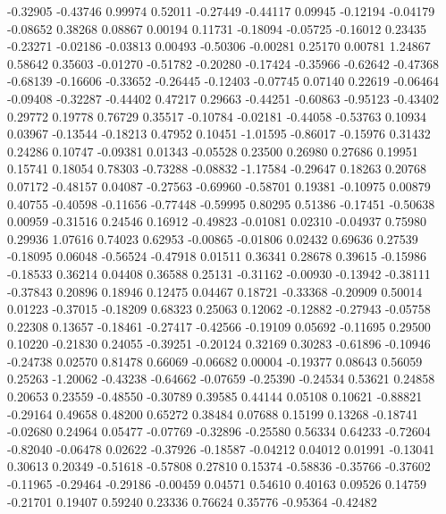   -0.32905 -0.43746
   0.99974  0.52011
  -0.27449 -0.44117
   0.09945 -0.12194
  -0.04179 -0.08652
   0.38268  0.08867
   0.00194  0.11731
  -0.18094 -0.05725
  -0.16012  0.23435
  -0.23271 -0.02186
  -0.03813  0.00493
  -0.50306 -0.00281
   0.25170  0.00781
   1.24867  0.58642
   0.35603 -0.01270
  -0.51782 -0.20280
  -0.17424 -0.35966
  -0.62642 -0.47368
  -0.68139 -0.16606
  -0.33652 -0.26445
  -0.12403 -0.07745
   0.07140  0.22619
  -0.06464 -0.09408
  -0.32287 -0.44402
   0.47217  0.29663
  -0.44251 -0.60863
  -0.95123 -0.43402
   0.29772  0.19778
   0.76729  0.35517
  -0.10784 -0.02181
  -0.44058 -0.53763
   0.10934  0.03967
  -0.13544 -0.18213
   0.47952  0.10451
  -1.01595 -0.86017
  -0.15976  0.31432
   0.24286  0.10747
  -0.09381  0.01343
  -0.05528  0.23500
   0.26980  0.27686
   0.19951  0.15741
   0.18054  0.78303
  -0.73288 -0.08832
  -1.17584 -0.29647
   0.18263  0.20768
   0.07172 -0.48157
   0.04087 -0.27563
  -0.69960 -0.58701
   0.19381 -0.10975
   0.00879  0.40755
  -0.40598 -0.11656
  -0.77448 -0.59995
   0.80295  0.51386
  -0.17451 -0.50638
   0.00959 -0.31516
   0.24546  0.16912
  -0.49823 -0.01081
   0.02310 -0.04937
   0.75980  0.29936
   1.07616  0.74023
   0.62953 -0.00865
  -0.01806  0.02432
   0.69636  0.27539
  -0.18095  0.06048
  -0.56524 -0.47918
   0.01511  0.36341
   0.28678  0.39615
  -0.15986 -0.18533
   0.36214  0.04408
   0.36588  0.25131
  -0.31162 -0.00930
  -0.13942 -0.38111
  -0.37843  0.20896
   0.18946  0.12475
   0.04467  0.18721
  -0.33368 -0.20909
   0.50014  0.01223
  -0.37015 -0.18209
   0.68323  0.25063
   0.12062 -0.12882
  -0.27943 -0.05758
   0.22308  0.13657
  -0.18461 -0.27417
  -0.42566 -0.19109
   0.05692 -0.11695
   0.29500  0.10220
  -0.21830  0.24055
  -0.39251 -0.20124
   0.32169  0.30283
  -0.61896 -0.10946
  -0.24738  0.02570
   0.81478  0.66069
  -0.06682  0.00004
  -0.19377  0.08643
   0.56059  0.25263
  -1.20062 -0.43238
  -0.64662 -0.07659
  -0.25390 -0.24534
   0.53621  0.24858
   0.20653  0.23559
  -0.48550 -0.30789
   0.39585  0.44144
   0.05108  0.10621
  -0.88821 -0.29164
   0.49658  0.48200
   0.65272  0.38484
   0.07688  0.15199
   0.13268 -0.18741
  -0.02680  0.24964
   0.05477 -0.07769
  -0.32896 -0.25580
   0.56334  0.64233
  -0.72604 -0.82040
  -0.06478  0.02622
  -0.37926 -0.18587
  -0.04212  0.04012
   0.01991 -0.13041
   0.30613  0.20349
  -0.51618 -0.57808
   0.27810  0.15374
  -0.58836 -0.35766
  -0.37602 -0.11965
  -0.29464 -0.29186
  -0.00459  0.04571
   0.54610  0.40163
   0.09526  0.14759
  -0.21701  0.19407
   0.59240  0.23336
   0.76624  0.35776
  -0.95364 -0.42482
